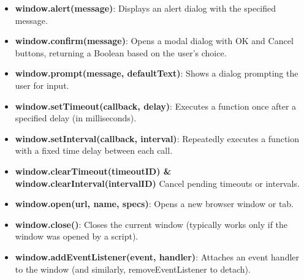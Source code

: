 \documentclass{report}
\begin{document}
    \begin{itemize}
        \item \textbf{window.alert(message)}: Displays an alert dialog with the specified message.
        \item \textbf{window.confirm(message)}: Opens a modal dialog with OK and Cancel buttons, returning a Boolean based on the user's choice.
        \item \textbf{window.prompt(message, defaultText)}: Shows a dialog prompting the user for input.
        \item \textbf{window.setTimeout(callback, delay)}: Executes a function once after a specified delay (in milliseconds).
        \item \textbf{window.setInterval(callback, interval)}: Repeatedly executes a function with a fixed time delay between each call.
        \item \textbf{window.clearTimeout(timeoutID) \& window.clearInterval(intervalID)} Cancel pending timeouts or intervals.
        \item \textbf{window.open(url, name, specs)}: Opens a new browser window or tab.
        \item \textbf{window.close()}: Closes the current window (typically works only if the window was opened by a script).
        \item \textbf{window.addEventListener(event, handler)}: Attaches an event handler to the window (and similarly, removeEventListener to detach).
    \end{itemize}

    \bigbreak \noindent 
\end{document}
